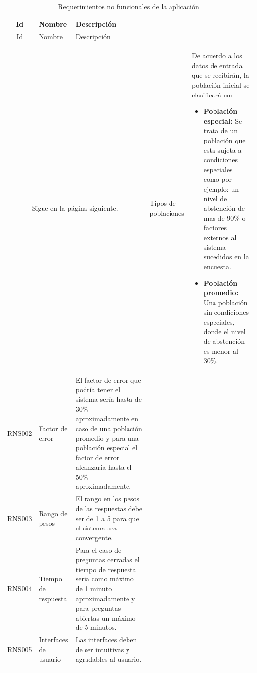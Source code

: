 \begin{longtable}{|c|m{4cm}|m{9.5cm}|}
    \hline
    \rowcolor[HTML]{3531FF} 
    {\color[HTML]{FFFFFF} Id} &{\color[HTML]{FFFFFF}Nombre} & {\color[HTML]{FFFFFF} Descripción} \\ \hline
    \endfirsthead
    \hline
    \rowcolor[HTML]{3531FF} 
    {\color[HTML]{FFFFFF} Id} &{\color[HTML]{FFFFFF}Nombre} & {\color[HTML]{FFFFFF} Descripción} \\
    \hline 
    \endhead
    \multicolumn{3}{c}{Sigue en la página siguiente.}
    \endfoot
    \endlastfoot
    \hline
    RNS001&Tipos de poblaciones&De acuerdo a los datos de entrada que se recibirán, la población inicial se clasificará en:
    \begin{itemize}
        \item \textbf{Población especial: }Se trata de un población que esta sujeta a condiciones especiales como por ejemplo: un nivel de abstención de mas de 90\% o factores externos al sistema sucedidos en la encuesta.
        \item \textbf{Población promedio: }Una población sin condiciones especiales, donde el nivel de abstención es menor al 30\%.
    \end{itemize}\\ \hline
    RNS002&Factor de error&El factor de error que podría tener el sistema sería hasta de 30\% aproximadamente en caso de una población promedio y para una población especial el factor de error alcanzaría hasta el 50\% aproximadamente.\\ \hline
    RNS003&Rango de pesos&El rango en los pesos de las respuestas debe ser de 1 a 5 para que el sistema sea convergente.\\ \hline
    RNS004&Tiempo de respuesta&Para el caso de preguntas cerradas el tiempo de respuesta sería como máximo de 1 minuto aproximadamente y para preguntas abiertas un máximo de 5 minutos. \\ \hline
    RNS005&Interfaces de usuario&Las interfaces deben de ser intuitivas y agradables al usuario.\\ \hline
    \caption{Requerimientos no funcionales de la aplicación}
    \label{table:RNS}
\end{longtable}
